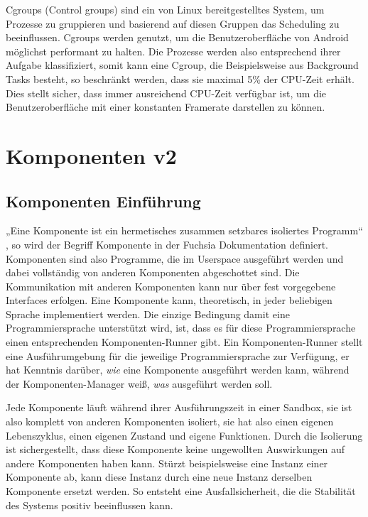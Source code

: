\documentclass[a4paper]{scrartcl}
\begin{document}
Cgroups (Control groups) sind ein von Linux bereitgestelltes System, um Prozesse zu gruppieren und basierend auf diesen Gruppen das Scheduling zu beeinflussen. Cgroups werden genutzt, um die Benutzeroberfläche von Android möglichst performant zu halten. Die Prozesse werden also entsprechend ihrer Aufgabe klassifiziert, somit kann eine Cgroup, die Beispielsweise aus Background Tasks besteht, so beschränkt werden, dass sie maximal 5\% der CPU-Zeit erhält. Dies stellt sicher, dass immer ausreichend CPU-Zeit verfügbar ist, um die Benutzeroberfläche mit einer konstanten Framerate darstellen zu können. \cite{Android.Process.Cgroup}
\section{Komponenten v2}
\subsection{Komponenten Einführung}
\label{sec:Components}
„Eine Komponente ist ein hermetisches zusammen setzbares isoliertes Programm“ \cite{Fuchsia.Components.Introduction}, so wird der Begriff Komponente in der Fuchsia Dokumentation definiert. Komponenten sind also Programme, die im Userspace ausgeführt werden und dabei vollständig von anderen Komponenten abgeschottet sind. Die Kommunikation mit anderen Komponenten kann nur über fest vorgegebene Interfaces erfolgen. Eine Komponente kann, theoretisch, in jeder beliebigen Sprache implementiert werden. Die einzige Bedingung damit eine Programmiersprache unterstützt wird, ist, dass es für diese Programmiersprache einen entsprechenden Komponenten-Runner gibt. Ein Komponenten-Runner stellt eine Ausführumgebung für die jeweilige Programmiersprache zur Verfügung, er hat Kenntnis darüber, \textit{wie} eine Komponente ausgeführt werden kann, während der Komponenten-Manager weiß, \textit{was} ausgeführt werden soll.

Jede Komponente läuft während ihrer Ausführungszeit in einer Sandbox, sie ist also komplett von anderen Komponenten isoliert, sie hat also einen eigenen Lebenszyklus, einen eigenen Zustand und eigene Funktionen. Durch die Isolierung ist sichergestellt, dass diese Komponente keine ungewollten Auswirkungen auf andere Komponenten haben kann. Stürzt beispielsweise eine Instanz einer Komponente ab, kann diese Instanz durch eine neue Instanz derselben Komponente ersetzt werden. So entsteht eine Ausfallsicherheit, die die Stabilität des Systems positiv beeinflussen kann. \cite{Fuchsia.Components.Introduction}
\end{document}
